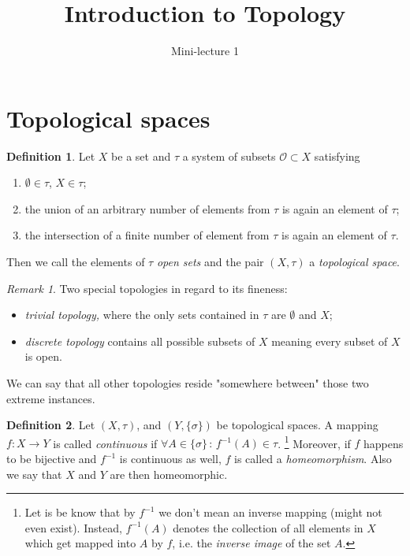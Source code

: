 \documentclass[a4paper,11pt]{article}
\title{Introduction to Topology}
\author{Mini-lecture 1}
\date{}
\theoremstyle{theorem}
\theoremstyle{remark}
\newtheorem*{remark}{Remark}
\theoremstyle{definition}
\newtheorem{definition}{Definition}
\begin{document}
	
	\maketitle
	
	
	\section{Topological spaces}
	
		\begin{definition}
			Let $X$ be a set and $\tau$ a system of subsets $\mathcal O \subset X$ satisfying
			\begin{enumerate}[label=(\alph*)]
				\item $\emptyset \in \tau$, $X \in \tau$;
				\item the union of an arbitrary number of elements from $\tau$ is again an element of $\tau$;
				\item the intersection of a finite number of element from $\tau$ is again an element of $\tau$.
			\end{enumerate}
			Then we call the elements of $\tau$ \emph{open sets} and the pair $(X, \tau)$ a \emph{topological space}.
		\end{definition}
	
		\begin{remark}
		Two special topologies in regard to its fineness:
		\begin{itemize}
			\item \emph{trivial topology,} where the only sets contained in $\tau$ are $\emptyset$ and $X$;
			\item \emph{discrete topology} contains all possible subsets of $X$ meaning every subset of $X$ is open.
		\end{itemize}
		We can say that all other topologies reside "somewhere between" those two extreme instances.
		\end{remark}
		
		\begin{definition}
			Let $(X, \tau)$, and $(Y, \{\sigma\})$ be topological spaces. A mapping $f:X \to Y$ is called \emph{continuous} if $\forall A \in \{\sigma\} \,:\, f^{-1}(A) \in \tau$.%
				\footnote{Let is be know that by $f^{-1}$ we don't mean an inverse mapping (might not even exist). Instead, $f^{-1}(A)$ denotes the collection of all elements in $X$ which get mapped into $A$ by $f$, i.e. the \emph{inverse image} of the set $A$.}
			Moreover, if $f$ happens to be bijective and $f^{-1}$ is continuous as well, $f$ is called a \emph{homeomorphism}. Also we say that $X$ and $Y$ are then homeomorphic.
		\end{definition}
		
\end{document}
